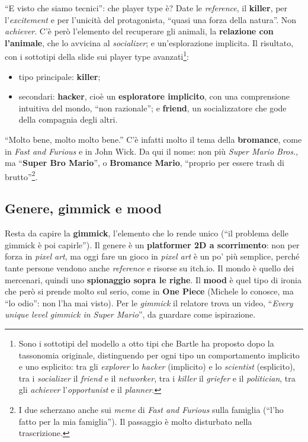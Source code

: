 ``E visto che siamo tecnici'': che player type è? Date le \emph{reference}, il
\textbf{killer}, per l'\emph{excitement} e per l'unicità del protagonista, ``quasi
una forza della natura''. Non \emph{achiever}. C'è però l'elemento del
recuperare gli animali, la \textbf{relazione con l'animale}, che lo avvicina al
\emph{socializer}; e un'esplorazione implicita. Il risultato, con i sottotipi
della slide sui player type avanzati\footnote{Sono i sottotipi del modello a otto
tipi che Bartle ha proposto dopo la tassonomia originale, distinguendo per ogni
tipo un comportamento implicito e uno esplicito: tra gli \emph{explorer} lo
\emph{hacker} (implicito) e lo \emph{scientist} (esplicito), tra i
\emph{socializer} il \emph{friend} e il \emph{networker}, tra i \emph{killer} il
\emph{griefer} e il \emph{politician}, tra gli \emph{achiever}
l'\emph{opportunist} e il \emph{planner}.}:
\begin{itemize}
  \item tipo principale: \textbf{killer};
  \item secondari: \textbf{hacker}, cioè un \textbf{esploratore implicito}, con
        una comprensione intuitiva del mondo, ``non razionale''; e
        \textbf{friend}, un socializzatore che gode della compagnia degli altri.
\end{itemize}
``Molto bene, molto molto bene.'' C'è infatti molto il tema della
\textbf{bromance}, come in \emph{Fast and Furious} e in John Wick. Da qui il
nome: non più \emph{Super Mario Bros.}, ma ``\textbf{Super Bro Mario}'', o
\textbf{Bromance Mario}, ``proprio per essere trash di brutto''\footnote{I due
scherzano anche sui \emph{meme} di \emph{Fast and Furious} sulla famiglia (``l'ho
fatto per la mia famiglia''). Il passaggio è molto disturbato nella
trascrizione.}.

\subsection{Genere, gimmick e mood}

Resta da capire la \textbf{gimmick}, l'elemento che lo rende unico (``il problema
delle gimmick è poi capirle''). Il genere è un \textbf{platformer 2D a
scorrimento}: non per forza in \emph{pixel art}, ma oggi fare un gioco in
\emph{pixel art} è un po' più semplice, perché tante persone vendono anche
\emph{reference} e risorse su itch.io. Il mondo è quello dei mercenari, quindi uno
\textbf{spionaggio sopra le righe}. Il \textbf{mood} è quel tipo di ironia che
però si prende molto sul serio, come in \textbf{One Piece} (Michele lo conosce, ma
``lo odio'': non l'ha mai visto). Per le \emph{gimmick} il relatore trova un video,
``\emph{Every unique level gimmick in Super Mario}'', da guardare come ispirazione.

